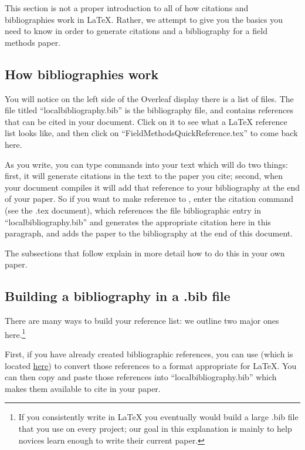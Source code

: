 \documentclass[output=paper,colorlinks,citecolor=brown]{langscibook}
\begin{document}
This section is not a proper introduction to all of how citations and bibliographies work in \LaTeX{}. Rather, we attempt to give you the basics you need to know in order to generate citations and a bibliography for a field methods paper. 

\subsection{How bibliographies work}

You will notice on the left side of the Overleaf display there is a list of files. The file titled ``localbibliography.bib'' is the bibliography file, and contains references that can be cited in your document. Click on it to see what a \LaTeX{} reference list looks like, and then click on ``FieldMethodsQuickReference.tex'' to come back here. 

As you write, you can type commands into your text which will do two things: first, it will generate citations in the text to the paper you cite; second, when your document compiles it will add that reference to your bibliography at the end of your paper. So if you want to make reference to \citet{BresnanMchombo1987ChichewaSmOm}, enter the citation command (see the .tex document), which references the file bibliographic entry in ``localbibliography.bib'' and generates the appropriate citation here in this paragraph, and adds the \citeauthor{BresnanMchombo1987ChichewaSmOm} paper to the bibliography at the end of this document.

The subsections that follow explain in more detail how to do this in your own paper. 

\subsection{Building a bibliography in a .bib file}

There are many ways to build your reference list: we outline two major ones here.\footnote{If you consistently write in \LaTeX{} you eventually would build a large .bib file that you use on every project; our goal in this explanation is mainly to help novices learn enough to write their current paper.}

First, if you have already created bibliographic references, you can use \citet{Nordhoff2018} (which is located \href{http://glottotopia.org/doc2tex/doc2bib}{here}) to convert those references to a format appropriate for \LaTeX{}. You can then copy and paste those references into ``localbibliography.bib'' which makes them available to cite in your paper.
\end{document}
